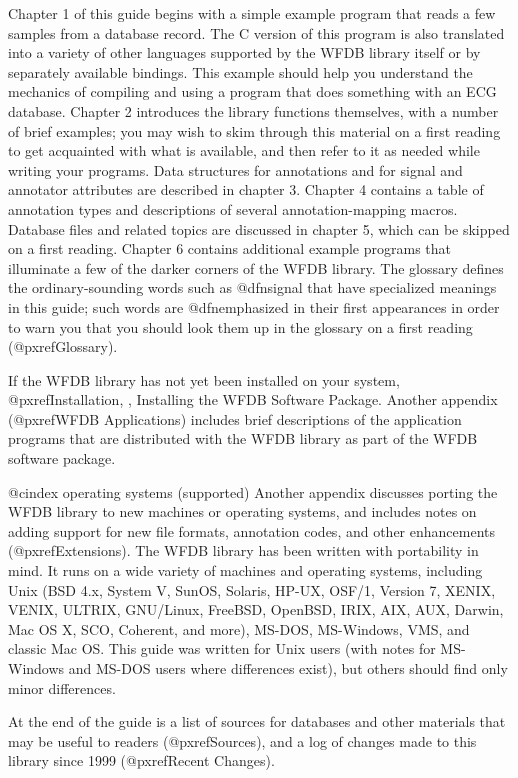 Chapter 1 of this guide begins with a simple example program that reads a few
samples from a database record.  The C version of this program is also
translated into a variety of other languages supported by the WFDB library
itself or by separately available bindings.  This example should help you
understand the mechanics of compiling and using a program that does something
with an ECG database.  Chapter 2 introduces the library functions themselves,
with a number of brief examples; you may wish to skim through this material on
a first reading to get acquainted with what is available, and then refer to it
as needed while writing your programs.  Data structures for annotations and for
signal and annotator attributes are described in chapter 3.  Chapter 4 contains
a table of annotation types and descriptions of several annotation-mapping
macros.  Database files and related topics are discussed in chapter 5, which
can be skipped on a first reading.  Chapter 6 contains additional example
programs that illuminate a few of the darker corners of the WFDB library.  The
glossary defines the ordinary-sounding words such as @dfn{signal} that have
specialized meanings in this guide; such words are @dfn{emphasized} in their
first appearances in order to warn you that you should look them up in the
glossary on a first reading (@pxref{Glossary}).

If the WFDB library has not yet been installed on your system,
@pxref{Installation, , Installing the WFDB Software Package}.
Another appendix (@pxref{WFDB Applications}) includes brief
descriptions of the application programs that are distributed with the
WFDB library as part of the WFDB software package.

@cindex operating systems (supported)
Another appendix discusses porting the WFDB library to new machines or
operating systems, and includes notes on adding support for new file
formats, annotation codes, and other enhancements (@pxref{Extensions}).
The WFDB library has been written with portability in mind.  It runs on
a wide variety of machines and operating systems, including Unix (BSD
4.x, System V, SunOS, Solaris, HP-UX, OSF/1, Version 7, XENIX, VENIX,
ULTRIX, GNU/Linux, FreeBSD, OpenBSD, IRIX, AIX, AUX, Darwin, Mac OS X, SCO,
Coherent, and more), MS-DOS, MS-Windows, VMS, and classic Mac OS.
This guide was written for Unix users (with notes for MS-Windows and
MS-DOS users where differences exist), but others should find only minor
differences.

At the end of the guide is a list of sources for databases and other
materials that may be useful to readers (@pxref{Sources}), and a log
of changes made to this library since 1999 (@pxref{Recent Changes}).

